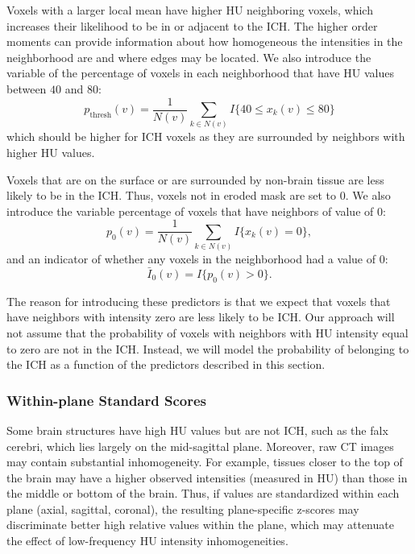 \documentclass{elsarticle_nonatbib}\usepackage[]{graphicx}\usepackage[]{color}
\begin{document}
Voxels with a larger local mean have higher HU neighboring voxels, which increases their likelihood to be in or adjacent to the ICH.  The higher order moments can provide information about how homogeneous the intensities in the neighborhood are and where edges may be located.  We also introduce the variable of the percentage of voxels in each neighborhood that have HU values between $40$ and $80$:
\begin{equation}
p_{\text{thresh}}(v) = \frac{1}{N(v)} \sum_{k \in N(v)} I\{ 40 \leq x_k(v) \leq 80 \} \label{eq:pct}
\end{equation}
which should be higher for ICH voxels as they are surrounded by neighbors with higher HU values.  

Voxels that are on the surface or are surrounded by non-brain tissue are less likely to be in the ICH.  Thus, voxels not in eroded mask are set to $0$.    
We also introduce the variable percentage of voxels that have neighbors of value of $0$:
\begin{equation}
p_{0}(v) = \frac{1}{N(v)} \sum_{k \in N(v)} I\{ x_k(v) = 0 \}, \label{eq:pct0}
\end{equation}
and an indicator of whether any voxels in the neighborhood had a value of $0$:
\begin{equation}
\bar{I}_{0}(v) = I\{ p_{0}(v) > 0 \}. \label{eq:I0}
\end{equation}

The reason for introducing these predictors is that we expect that voxels that have neighbors with intensity zero are less likely to be ICH. Our approach will not assume that the probability of voxels with neighbors with HU intensity equal to zero are not in the ICH. Instead, we will model the probability of belonging to the ICH as a function of the predictors described in this section. 
 
\subsubsection{Within-plane Standard Scores} Some brain structures have high HU values but are not ICH, such as the falx cerebri, which lies largely on the mid-sagittal plane.  Moreover, raw CT images may contain substantial inhomogeneity. For example, tissues closer to the top of the brain may have a higher observed intensities (measured in HU) than those in the middle or bottom of the brain.  Thus, if values are standardized within each plane (axial, sagittal, coronal), the resulting plane-specific z-scores may discriminate better high relative values within the plane, which may attenuate the effect of low-frequency HU intensity inhomogeneities.
\end{document}
